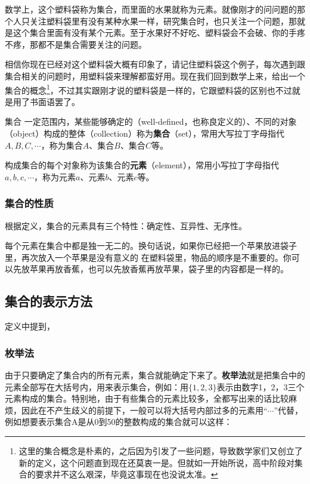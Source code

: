 数学上，这个塑料袋称为集合，而里面的水果就称为元素。就像刚才的问问题的那个人只关注塑料袋里有没有某种水果一样，研究集合时，也只关注一个问题，那就是这个集合里面有没有某个元素。至于水果好不好吃、塑料袋会不会破、你的手疼不疼，那都不是集合需要关注的问题。

相信你现在已经对这个塑料袋大概有印象了，请记住塑料袋这个例子，每次遇到跟集合相关的问题时，用塑料袋来理解都蛮好用。现在我们回到数学上来，给出一个集合的概念\footnote{这里的集合概念是朴素的，之后因为引发了一些问题，导致数学家们又创立了新的定义，这个问题直到现在还莫衷一是。但就如一开始所说，高中阶段对集合的要求并不这么艰深，毕竟这事现在也没说太准。}，不过其实跟刚才说的塑料袋是一样的，它跟塑料袋的区别也不过就是用了书面语罢了。

\begin{definition}{集合}
一定范围内，某些能够确定的（well-defined，也称良定义的）、不同的对象（object）构成的整体（collection）称为\textbf{集合}（set），常用大写拉丁字母指代$A,B,C,\cdots$，称为集合$A$、集合$B$、集合$C$等。

构成集合的每个对象称为该集合的\textbf{元素}（element），常用小写拉丁字母指代$a,b,c,\cdots$，称为元素$a$、元素$b$、元素$c$等。
\end{definition}

\subsubsection{集合的性质}

根据定义，集合的元素具有三个特性：确定性、互异性、无序性。


每个元素在集合中都是独一无二的。换句话说，如果你已经把一个苹果放进袋子里，再次放入一个苹果是没有意义的
在塑料袋里，物品的顺序是不重要的。你可以先放苹果再放香蕉，也可以先放香蕉再放苹果，袋子里的内容都是一样的。

\subsection{集合的表示方法}
定义中提到，
\subsubsection{枚举法}

由于只要确定了集合内的所有元素，集合就能确定下来了。\textbf{枚举法}就是把集合中的元素全部写在大括号内，用来表示集合，例如：用$\{1,2,3\}$表示由数字1，2，3三个元素构成的集合。特别地，由于有些集合的元素比较多，全都写出来的话比较麻烦，因此在不产生歧义的前提下，一般可以将大括号内部过多的元素用“$\cdots$”代替，例如想要表示集合A是从0到50的整数构成的集合就可以这样：

